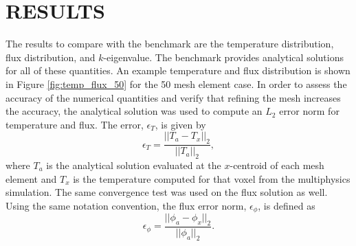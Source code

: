 \documentclass[letterpaper]{mc2023}
\begin{document}
\section{RESULTS}\label{sec:results}
The results to compare with the benchmark are the temperature distribution, flux distribution, and $k$-eigenvalue. The benchmark provides
analytical solutions for all of these quantities. An example temperature and flux distribution is shown in Figure \ref{fig:temp_flux_50}
for the 50 mesh element case. In order to assess the accuracy of the numerical quantities and verify that refining the mesh increases the
accuracy, the analytical solution was used to compute an $L_{2}$ error norm for temperature and flux. The error, $\epsilon_{T}$, is given by
\begin{equation}
    \epsilon_{T} = \frac{|| T_{a} - T_{x} ||_{2}}{|| T_{a} ||_{2}},
\end{equation}
where $T_{a}$ is the analytical solution evaluated at the $x$-centroid of each mesh element and $T_{x}$ is the temperature computed for that
voxel from the multiphysics simulation. The same convergence test was used on the flux solution as well. Using the same notation convention,
the flux error norm, $\epsilon_{\phi}$, is defined as
\begin{equation}
    \epsilon_{\phi} =  \frac{|| \phi_{a} - \phi_{x} ||_{2}}{|| \phi_{a} ||_{2}}.
\end{equation}
\end{document}
